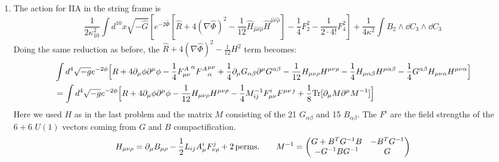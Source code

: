 \documentclass[11pt, class=article, crop=false]{standalone}
\begin{document}
\begin{enumerate}
	\item The action for IIA in the string frame is
	\[
		\frac{1}{2 \kappa_{10}^2} \int d^{10} x \sqrt{-\hat G} \left[e^{-2\hat \Phi} [\hat R + 4 (\nabla \hat \Phi)^2  - \frac{1}{12} \hat H_{\hat \mu \hat \nu \hat \rho} \hat H^{\hat \mu \hat \nu \hat \rho}] - \frac{1}{4} F_2^2 - \frac{1}{2 \cdot 4!} F_4^2 \right] + \frac{1}{4 \kappa^2} \int B_2 \wedge \dd C_3 \wedge \dd C_3
	\]
	Doing the same reduction as before, the $\hat R + 4 (\nabla \hat \Phi)^2 - \frac{1}{12} H^2$ term becomes:
	\[
	\begin{aligned}
		& \int d^4 \sqrt{-g} e^{-2\phi} \Big[R + 4 \partial_\mu \phi \partial^\mu \phi  - \frac14  {F^{A}_{\mu \nu}}^{\alpha} {F^A}^{\mu \nu}_\alpha  + \frac14 \partial_\mu G_{\alpha \beta} \partial^\mu G^{\alpha \beta}  -\frac{1}{12} H_{\mu \nu \rho} H^{\mu \nu \rho}   - \frac{1}{4} H_{\mu \alpha \beta} H^{\mu \alpha \beta} - \frac{1}{4} G^{\alpha \beta} H_{\mu \nu \alpha} H^{\mu \nu \alpha} \Big]\\
		&= \int d^4 \sqrt{-g} e^{-2\phi} \Big[R + 4 \partial_\mu \phi \partial^\mu \phi  -\frac{1}{12} H_{\mu \nu \rho} H^{\mu \nu \rho}  - \frac14 M_{ij}^{-1} F_{\mu \nu}^{i} F^{\mu \nu\, j} + \frac18 \mathrm{Tr}[\partial_\mu M \partial^\mu M^{-1}]\Big]
	\end{aligned}
	\] 
	Here we used $H$ as in the last problem and the matrix $M$ consisting of the 21 $G_{\alpha \beta}$ and 15 $B_{\alpha \beta}$. The $F^i$ are the field strengths of the $6+6$ $U(1)$ vectors coming from $G$ and $B$ compactification.
	\[
		H_{\mu \nu \rho} = \partial_\mu B_{\mu \rho} - \frac12 L_{ij} A^i_\mu  F^j_{\nu \rho} + 2 \,\mathrm{perms.}
		 \qquad M^{-1} = \begin{pmatrix}
			G + B^T G^{-1} B & - B^T G^{-1}\\
			- G^{-1} B G^{-1} & G
		\end{pmatrix}
	\]
	

\end{enumerate}
\end{document}

